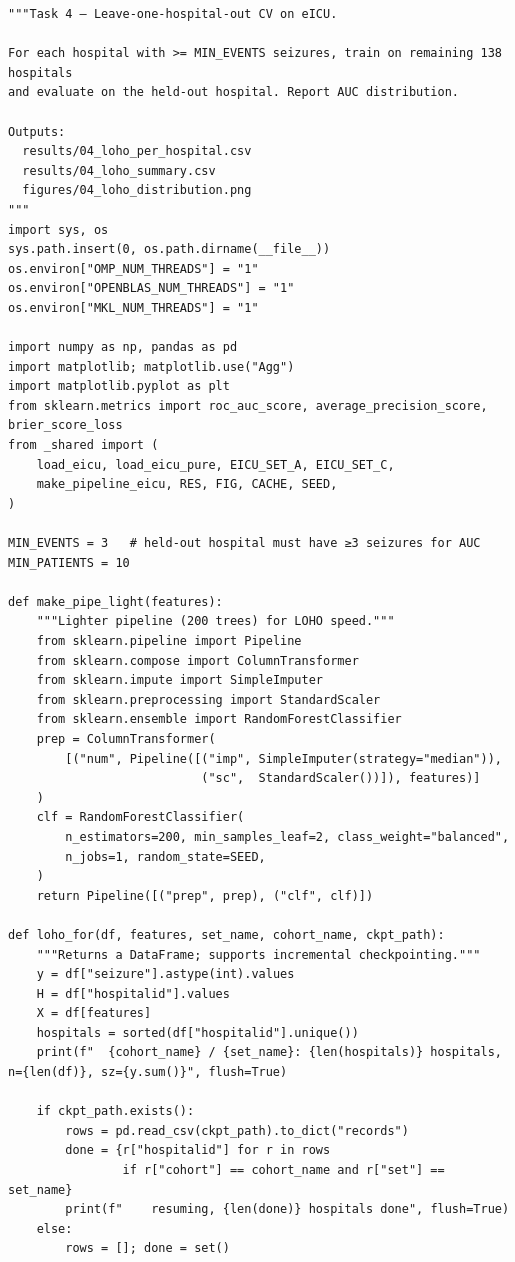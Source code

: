 \documentclass[11pt,a4paper]{article}
\begin{document}
\begin{lstlisting}[style=codeblock]
"""Task 4 — Leave-one-hospital-out CV on eICU.

For each hospital with >= MIN_EVENTS seizures, train on remaining 138 hospitals
and evaluate on the held-out hospital. Report AUC distribution.

Outputs:
  results/04_loho_per_hospital.csv
  results/04_loho_summary.csv
  figures/04_loho_distribution.png
"""
import sys, os
sys.path.insert(0, os.path.dirname(__file__))
os.environ["OMP_NUM_THREADS"] = "1"
os.environ["OPENBLAS_NUM_THREADS"] = "1"
os.environ["MKL_NUM_THREADS"] = "1"

import numpy as np, pandas as pd
import matplotlib; matplotlib.use("Agg")
import matplotlib.pyplot as plt
from sklearn.metrics import roc_auc_score, average_precision_score, brier_score_loss
from _shared import (
    load_eicu, load_eicu_pure, EICU_SET_A, EICU_SET_C,
    make_pipeline_eicu, RES, FIG, CACHE, SEED,
)

MIN_EVENTS = 3   # held-out hospital must have ≥3 seizures for AUC
MIN_PATIENTS = 10

def make_pipe_light(features):
    """Lighter pipeline (200 trees) for LOHO speed."""
    from sklearn.pipeline import Pipeline
    from sklearn.compose import ColumnTransformer
    from sklearn.impute import SimpleImputer
    from sklearn.preprocessing import StandardScaler
    from sklearn.ensemble import RandomForestClassifier
    prep = ColumnTransformer(
        [("num", Pipeline([("imp", SimpleImputer(strategy="median")),
                           ("sc",  StandardScaler())]), features)]
    )
    clf = RandomForestClassifier(
        n_estimators=200, min_samples_leaf=2, class_weight="balanced",
        n_jobs=1, random_state=SEED,
    )
    return Pipeline([("prep", prep), ("clf", clf)])

def loho_for(df, features, set_name, cohort_name, ckpt_path):
    """Returns a DataFrame; supports incremental checkpointing."""
    y = df["seizure"].astype(int).values
    H = df["hospitalid"].values
    X = df[features]
    hospitals = sorted(df["hospitalid"].unique())
    print(f"  {cohort_name} / {set_name}: {len(hospitals)} hospitals, n={len(df)}, sz={y.sum()}", flush=True)

    if ckpt_path.exists():
        rows = pd.read_csv(ckpt_path).to_dict("records")
        done = {r["hospitalid"] for r in rows
                if r["cohort"] == cohort_name and r["set"] == set_name}
        print(f"    resuming, {len(done)} hospitals done", flush=True)
    else:
        rows = []; done = set()


\end{lstlisting}
\end{document}
